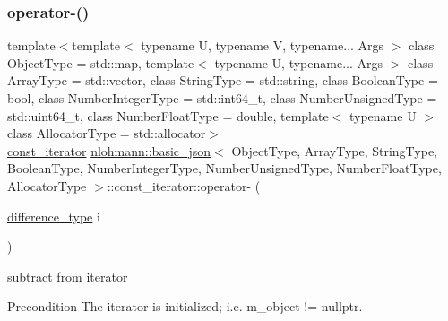 \subsubsection{\texorpdfstring{operator-\/()}{operator-()}\hspace{0.1cm}{\footnotesize\ttfamily [1/2]}}
{\footnotesize\ttfamily template$<$template$<$ typename U, typename V, typename... Args $>$ class Object\+Type = std\+::map, template$<$ typename U, typename... Args $>$ class Array\+Type = std\+::vector, class String\+Type  = std\+::string, class Boolean\+Type  = bool, class Number\+Integer\+Type  = std\+::int64\+\_\+t, class Number\+Unsigned\+Type  = std\+::uint64\+\_\+t, class Number\+Float\+Type  = double, template$<$ typename U $>$ class Allocator\+Type = std\+::allocator$>$ \\
\hyperlink{classnlohmann_1_1basic__json_1_1const__iterator}{const\+\_\+iterator} \hyperlink{classnlohmann_1_1basic__json}{nlohmann\+::basic\+\_\+json}$<$ Object\+Type, Array\+Type, String\+Type, Boolean\+Type, Number\+Integer\+Type, Number\+Unsigned\+Type, Number\+Float\+Type, Allocator\+Type $>$\+::const\+\_\+iterator\+::operator-\/ (\begin{DoxyParamCaption}\item[{\hyperlink{classnlohmann_1_1basic__json_1_1const__iterator_a49d7c3e9ef3280df03052cce988b792f}{difference\+\_\+type}}]{i }\end{DoxyParamCaption})\hspace{0.3cm}{\ttfamily [inline]}}



subtract from iterator 

\begin{DoxyPrecond}{Precondition}
The iterator is initialized; i.\+e. {\ttfamily m\+\_\+object != nullptr}. 
\end{DoxyPrecond}
\mbox{\label{classnlohmann_1_1basic__json_1_1const__iterator_af3ef241a9e26398ea0cf45026287c2ed}} 
